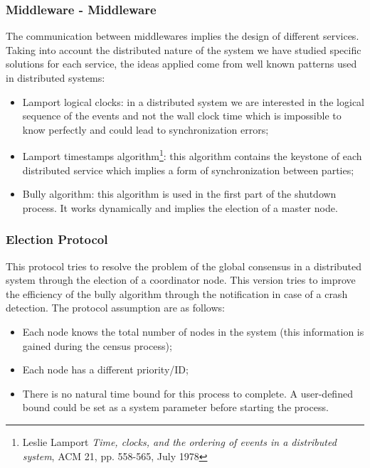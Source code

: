 \subsubsection{Middleware - Middleware}

The communication between middlewares implies the design of different
services. Taking into account the distributed nature of the system we have
studied specific solutions for each service, the ideas applied come from
well known patterns used in distributed systems:

\begin{itemize}
\item Lamport logical clocks: in a distributed system we are interested
  in the logical sequence of the events and not the wall clock time which is
  impossible to know perfectly and could lead to synchronization errors;
\item Lamport timestamps algorithm\footnote{Leslie Lamport \textit{Time,
  clocks, and the ordering of events in a distributed system}, ACM 21,
  pp. 558-565, July 1978}: this algorithm contains the keystone
  of each distributed service which implies a form of synchronization
  between parties;
\item Bully algorithm: this algorithm is used in the first part of the
  shutdown process. It works dynamically and implies the election of a master
  node.
\end{itemize}

\subsubsection{Election Protocol}\label{sec:election}
This protocol tries to resolve the problem of the global consensus in a
distributed system through the election of a coordinator node. This version
tries to improve the efficiency of the bully algorithm through the
notification in case of a crash detection. The protocol assumption are as
follows:

\begin{itemize}
\item Each node knows the total number of nodes in the system (this
  information is gained during the census process);
\item Each node has a different priority/ID;
\item There is no natural time bound for this process to complete. A
  user-defined bound could be set as a system parameter before starting the
  process.
\end{itemize}

